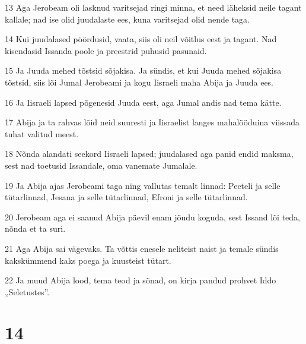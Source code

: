 \par 13 Aga Jerobeam oli lasknud varitsejad ringi minna, et need läheksid neile tagant kallale; nad ise olid juudalaste ees, kuna varitsejad olid nende taga.
\par 14 Kui juudalased pöördusid, vaata, siis oli neil võitlus eest ja tagant. Nad kisendasid Issanda poole ja preestrid puhusid pasunaid.
\par 15 Ja Juuda mehed tõstsid sõjakisa. Ja sündis, et kui Juuda mehed sõjakisa tõstsid, siis lõi Jumal Jerobeami ja kogu Iisraeli maha Abija ja Juuda ees.
\par 16 Ja Iisraeli lapsed põgenesid Juuda eest, aga Jumal andis nad tema kätte.
\par 17 Abija ja ta rahvas lõid neid suuresti ja Iisraelist langes mahalööduina viissada tuhat valitud meest.
\par 18 Nõnda alandati seekord Iisraeli lapsed; juudalased aga panid endid maksma, sest nad toetusid Issandale, oma vanemate Jumalale.
\par 19 Ja Abija ajas Jerobeami taga ning vallutas temalt linnad: Peeteli ja selle tütarlinnad, Jesana ja selle tütarlinnad, Efroni ja selle tütarlinnad.
\par 20 Jerobeam aga ei saanud Abija päevil enam jõudu koguda, sest Issand lõi teda, nõnda et ta suri.
\par 21 Aga Abija sai vägevaks. Ta võttis enesele neliteist naist ja temale sündis kakskümmend kaks poega ja kuusteist tütart.
\par 22 Ja muud Abija lood, tema teod ja sõnad, on kirja pandud prohvet Iddo „Seletustes”.

\chapter{14}

